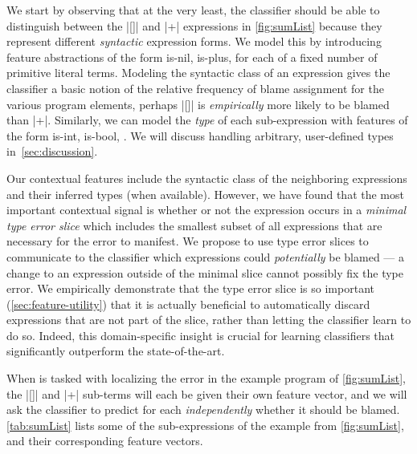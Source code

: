 %
We start by observing that
at the very least, the
classifier should be able
to distinguish between the
|[]| and |+| expressions
in \autoref{fig:sumList}
because they represent
different \emph{syntactic}
expression forms.
%
We model this by
introducing feature
abstractions of the form
is-nil, is-plus, \etc for
each of a fixed number of
primitive literal terms.
%
Modeling the syntactic class of an
expression gives the classifier a
basic notion of the relative
frequency of blame assignment
for the various program elements,
\ie perhaps |[]| is
\emph{empirically} more
likely to be blamed than |+|.
%
Similarly, we can model
the \emph{type} of each
sub-expression with features
of the form is-int, is-bool, \etc.
%
We will discuss handling
arbitrary, user-defined types
in~\autoref{sec:discussion}.

%
Our contextual features include the
syntactic class of the neighboring
expressions and their inferred types
(when available).
%
However, we have found that
the most important contextual
signal is whether or not the
expression occurs in a
\emph{minimal type error slice}
\citep{Tip2001-qp,Haack2003-vc}
which includes the smallest
subset of all expressions
that are necessary for the
error to manifest.
%
%
We propose to use type error slices
to communicate to the classifier
which expressions could
\emph{potentially} be blamed --- a
change to an expression outside of
the minimal slice cannot possibly
fix the type error.
%
We empirically demonstrate that
the type error slice is so
important (\autoref{sec:feature-utility})
that it is actually beneficial to
automatically discard expressions
that are not part of the slice,
rather than letting the classifier
learn to do so.
%
Indeed, this domain-specific
insight is crucial for learning
classifiers that significantly
outperform the state-of-the-art.

%
When \toolname is tasked with localizing
the error in the example program of \autoref{fig:sumList},
the |[]| and |+| sub-terms will each be given
their own feature vector, and we will ask the
classifier to predict for each \emph{independently}
whether it should be blamed.
%
\autoref{tab:sumList} lists some
of the sub-expressions of the example
from \autoref{fig:sumList}, and their
corresponding feature vectors.

